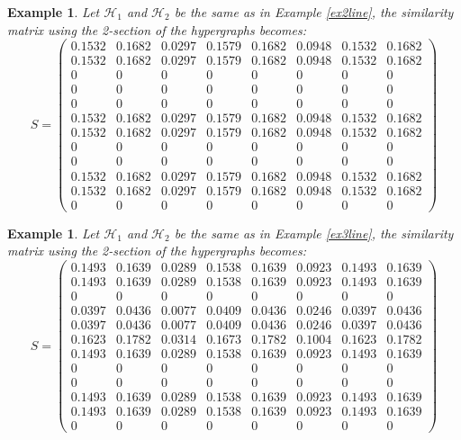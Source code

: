 \documentclass[a4paper,11pt]{report}
\newtheorem{example}[theorem]{Example}
\newcommand{\hgrafeen}{\mathcal{H}}
\begin{document}
 \begin{example}\label{ex2sec2}
   Let $\hgrafeen_1$ and $\hgrafeen_2$ be the same as in Example \ref{ex2line}, 
   the similarity matrix using the 2-section of the hypergraphs becomes:
   $$S = \begin{pmatrix}
   0.1532&0.1682&0.0297&0.1579&0.1682&0.0948&0.1532&0.1682\\
0.1532&0.1682&0.0297&0.1579&0.1682&0.0948&0.1532&0.1682\\
0&0&0&0&0&0&0&0\\
0&0&0&0&0&0&0&0\\
0&0&0&0&0&0&0&0\\
0.1532&0.1682&0.0297&0.1579&0.1682&0.0948&0.1532&0.1682\\
0.1532&0.1682&0.0297&0.1579&0.1682&0.0948&0.1532&0.1682\\
0&0&0&0&0&0&0&0\\
0&0&0&0&0&0&0&0\\
0.1532&0.1682&0.0297&0.1579&0.1682&0.0948&0.1532&0.1682\\
0.1532&0.1682&0.0297&0.1579&0.1682&0.0948&0.1532&0.1682\\
0&0&0&0&0&0&0&0
   \end{pmatrix}$$
   \end{example}
 
\begin{example}\label{ex2sec3}
     Let $\hgrafeen_1$ and $\hgrafeen_2$ be the same as in Example \ref{ex3line}, 
   the similarity matrix using the 2-section of the hypergraphs becomes:
   $$S = \begin{pmatrix}
0.1493&0.1639&0.0289&0.1538&0.1639&0.0923&0.1493&0.1639\\
0.1493&0.1639&0.0289&0.1538&0.1639&0.0923&0.1493&0.1639\\
0&0&0&0&0&0&0&0\\
0.0397&0.0436&0.0077&0.0409&0.0436&0.0246&0.0397&0.0436\\
0.0397&0.0436&0.0077&0.0409&0.0436&0.0246&0.0397&0.0436\\
0.1623&0.1782&0.0314&0.1673&0.1782&0.1004&0.1623&0.1782\\
0.1493&0.1639&0.0289&0.1538&0.1639&0.0923&0.1493&0.1639\\
0&0&0&0&0&0&0&0\\
0&0&0&0&0&0&0&0\\
0.1493&0.1639&0.0289&0.1538&0.1639&0.0923&0.1493&0.1639\\
0.1493&0.1639&0.0289&0.1538&0.1639&0.0923&0.1493&0.1639\\
0&0&0&0&0&0&0&0
   \end{pmatrix}$$
   
\end{example}
\end{document}
